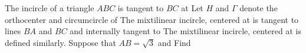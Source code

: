 The incircle of a triangle $ABC$ is tangent to $BC$ at 
Let $H$ and $\Gamma$ denote the orthocenter and circumcircle of 
The mixtilinear incircle, centered at 
is tangent to lines $BA$ and $BC$ and internally tangent to 
The mixtilinear incircle, centered at  is defined similarly.
Suppose that  $AB = \sqrt3$ and  Find 